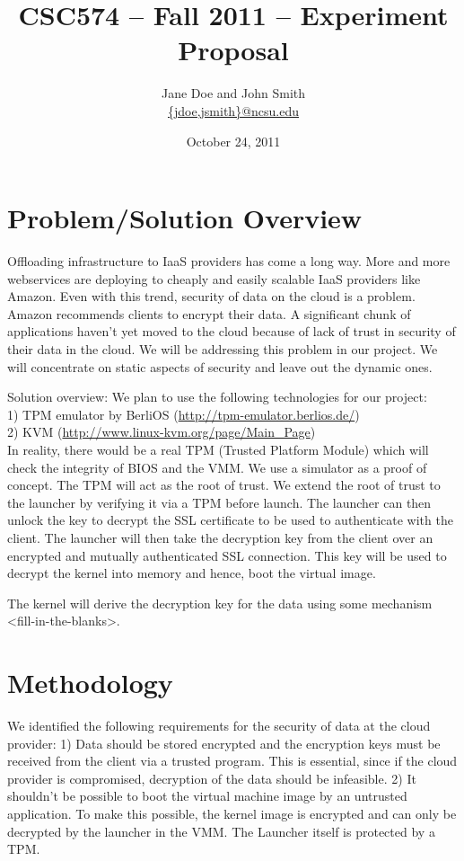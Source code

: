 \documentclass[11pt,pdftex]{article}
\title{CSC574 -- Fall 2011 -- Experiment Proposal}
\author{Jane Doe and John Smith \\
\url{{jdoe,jsmith}@ncsu.edu}
}
\date{October 24, 2011}
\begin{document}
\maketitle

\section{Problem/Solution Overview}
Offloading infrastructure to IaaS providers has come a long way. More and more webservices are deploying to cheaply and easily scalable IaaS providers like Amazon. Even with this trend, security of data on the cloud is a problem. Amazon recommends clients to encrypt their data. A significant chunk of applications haven't yet moved to the cloud because of lack of trust in security of their data in the cloud. We will be addressing this problem in our project. We will concentrate on static aspects of security and leave out the dynamic ones.

Solution overview:
We plan to use the following technologies for our project: \\
1) TPM emulator by BerliOS (\url{http://tpm-emulator.berlios.de/}) \\
2) KVM (\url{http://www.linux-kvm.org/page/Main_Page}) \\

In reality, there would be a real TPM (Trusted Platform Module) which will check the integrity of BIOS and the VMM. We use a simulator as a proof of concept. The TPM will act as the root of trust. We extend the root of trust to the launcher by verifying it via a TPM before launch. The launcher can then unlock the key to decrypt the SSL certificate to be used to authenticate with the client. The launcher will then take the decryption key from the client over an encrypted and mutually authenticated SSL connection. This key will be used to decrypt the kernel into memory and hence, boot the virtual image.

The kernel will derive the decryption key for the data using some mechanism <fill-in-the-blanks>. 


\section{Methodology}
We identified the following requirements for the security of data at the cloud provider:
1) Data should be stored encrypted and the encryption keys must be received from the client via a trusted program. This is essential, since if the cloud provider is compromised, decryption of the data should be infeasible.
2) It shouldn't be possible to boot the virtual machine image by an untrusted application. To make this possible, the kernel image is encrypted and can only be decrypted by the launcher in the VMM. The Launcher itself is protected by a TPM. 
\end{document}
